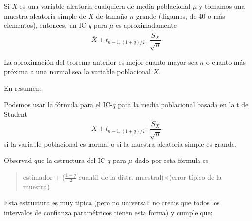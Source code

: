 \documentclass[
  spanish,
  letterpaper,
  DIV=11,
  numbers=noendperiod]{scrreprt}
\begin{document}
\begin{tcolorbox}[enhanced jigsaw, arc=.35mm, bottomrule=.15mm, bottomtitle=1mm, breakable, colback=white, colbacktitle=quarto-callout-note-color!10!white, colframe=quarto-callout-note-color-frame, coltitle=black, left=2mm, leftrule=.75mm, opacityback=0, opacitybacktitle=0.6, rightrule=.15mm, title=\textcolor{quarto-callout-note-color}{\faInfo}\hspace{0.5em}{Nota}, titlerule=0mm, toprule=.15mm, toptitle=1mm]

Si \(X\) es una variable aleatoria cualquiera de media poblacional
\(\mu\) y tomamos una muestra aleatoria simple de \(X\) de tamaño \(n\)
grande (digamos, de 40 o más elementos), entonces, un IC-\(q\) para
\(\mu\) es aproximadamente \[
\overline{X}\pm t_{n-1,(1+q)/2}\cdot \frac{\widetilde{S}_X}{\sqrt{n}}
\]

\end{tcolorbox}

La aproximación del teorema anterior es mejor cuanto mayor sea \(n\) o
cuanto más próxima a una normal sea la variable poblacional \(X\).

En resumen:

\begin{tcolorbox}[enhanced jigsaw, arc=.35mm, bottomrule=.15mm, bottomtitle=1mm, breakable, colback=white, colbacktitle=quarto-callout-important-color!10!white, colframe=quarto-callout-important-color-frame, coltitle=black, left=2mm, leftrule=.75mm, opacityback=0, opacitybacktitle=0.6, rightrule=.15mm, title=\textcolor{quarto-callout-important-color}{\faExclamation}\hspace{0.5em}{Importante}, titlerule=0mm, toprule=.15mm, toptitle=1mm]

Podemos usar la fórmula para el IC-\(q\) para la media poblacional
basada en la t de Student \[
\overline{X}\pm t_{n-1,(1+q)/2}\cdot \frac{\widetilde{S}_X}{\sqrt{n}}
\] si la variable poblacional es normal o si la muestra aleatoria simple
es grande.

\end{tcolorbox}

Observad que la estructura del IC-\(q\) para \(\mu\) dado por esta
fórmula es

\begin{quote}
estimador \(\pm\) (\(\frac{1+q}{2}\)-cuantil de la distr.
muestral)\(\times\)(error típico de la muestra)
\end{quote}

Esta estructura es muy típica (pero no universal: no creáis que todos
los intervalos de confianza paramétricos tienen esta forma) y cumple
que:
\end{document}
